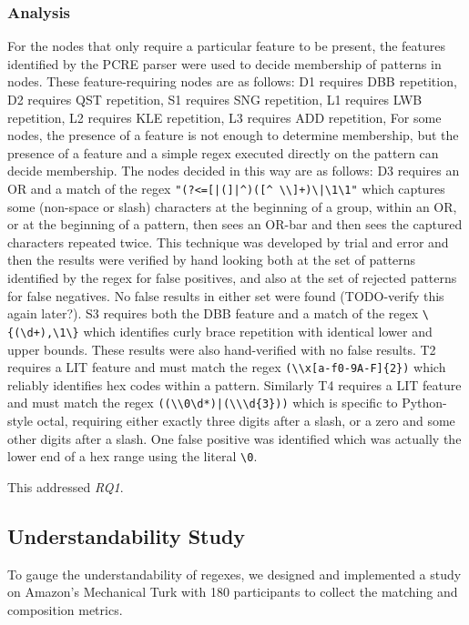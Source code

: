 \subsubsection{Analysis}
\label{communityanalysis}
For the nodes that only require a particular feature to be present, the features identified by the PCRE parser were used to decide membership of patterns in nodes.  These feature-requiring nodes are as follows: D1 requires DBB repetition, D2 requires QST repetition, S1 requires SNG repetition, L1 requires LWB repetition, L2 requires KLE repetition, L3 requires ADD repetition,
For some nodes, the presence of a feature is not enough to determine membership, but the presence of a feature and a simple regex executed directly on the pattern can decide membership.  The nodes decided in this way are as follows: D3 requires an OR and a match of the regex \verb!"(?<=[|(]|^)([^ \\]+)\|\1\1"! which captures some (non-space or slash) characters at the beginning of a group, within an OR, or at the beginning of a pattern, then sees an OR-bar and then sees the captured characters repeated twice.  This technique was developed by trial and error and then the results were verified by hand looking both at the set of patterns identified by the regex for false positives, and also at the set of rejected patterns for false negatives.  No false results in either set were found (TODO-verify this again later?).
S3 requires both the DBB feature and a match of the regex \verb!\{(\d+),\1\}! which identifies curly brace repetition with identical lower and upper bounds.  These results were also hand-verified with no false results.
T2 requires a LIT feature and must match the regex \verb!(\\x[a-f0-9A-F]{2})! which reliably identifies hex codes within a pattern.  Similarly T4 requires a LIT feature and must match the regex \verb!((\\0\d*)|(\\\d{3}))! which is specific to Python-style octal, requiring either exactly three digits after a slash, or a zero and some other digits after a slash.  One false positive was identified which was actually the lower end of a hex range using the literal \verb!\0!.


This addressed \emph{RQ1}.

\subsection{Understandability Study}
To gauge the understandability of regexes, we designed and implemented a study on Amazon's Mechanical Turk with 180 participants to collect the matching and composition metrics.

